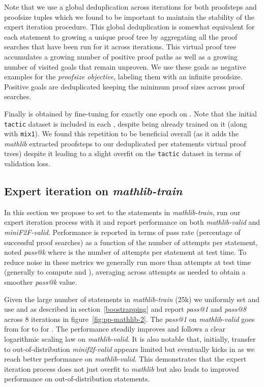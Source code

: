 \documentclass[nohyperref]{article}
\theoremstyle{plain}
\theoremstyle{definition}
\theoremstyle{remark}
\begin{document}
Note that we use a global deduplication across iterations for both proofsteps and proofsize tuples which we found to be important to maintain the stability of the expert iteration procedure. This global deduplication is somewhat equivalent for each statement to growing a unique proof tree by aggregating all the proof searches that have been run for it across iterations. This virtual proof tree accumulates a growing number of positive proof paths as well as a growing number of visited goals that remain unproven. We use these goals as negative examples for the \textit{proofsize objective}, labeling them with an infinite proofsize. Positive goals are deduplicated keeping the minimum proof sizes across proof searches.

Finally  is obtained by fine-tuning  for exactly one epoch on . Note that the initial \texttt{tactic} dataset is included in each , despite  being already trained on it (along with \texttt{mix1}). We found this repetition to be beneficial overall (as it adds the \textit{mathlib} extracted proofsteps to our deduplicated per statements virtual proof trees) despite it leading to a slight overfit on the \texttt{tactic} dataset in terms of validation loss.

\subsection{Expert iteration on \textit{mathlib-train}}
\label{expit-mathlib-train}

In this section we propose to set  to the statements in \textit{mathlib-train}, run our expert iteration process with it and report performance on both \textit{mathlib-valid} and \textit{miniF2F-valid}. Performance is reported in terms of pass rate (percentage of successful proof searches) as a function of the number of attempts per statement, noted \textit{pass@k} where  is the number of attempts per statement at test time. To reduce noise in these metrics we generally run more than  attempts at test time (generally  to compute  and ), averaging across attempts as needed to obtain a smoother \textit{pass@k} value.

Given the large number of statements in \textit{mathlib-train} (25k) we uniformly set  and use  and  as described in section~\ref{boostrapping} and report \textit{pass@1} and \textit{pass@8} across 8 iterations in figure~\ref{fig:pp-mathlib-2}. The \textit{pass@1} on \textit{mathlib-valid} goes from  for  to  for . The performance steadily improves and follows a clear logarithmic scaling law on \textit{mathlib-valid}. It is also notable that, initially, transfer to out-of-distribution \textit{minif2f-valid} appears limited but eventually kicks in as we reach better performance on \textit{mathlib-valid}. This demonstrates that the expert iteration process does not just overfit to \textit{mathlib} but also leads to improved performance on out-of-distribution statements.
\end{document}
